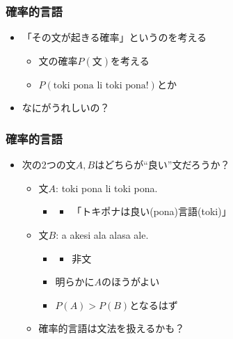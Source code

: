 \documentclass[14pt]{beamer}
\begin{document}
\begin{frame}
	\frametitle{確率的言語}

	\begin{itemize}
		\item 「その文が起きる確率」というのを考える
			\begin{itemize}
				\item 文の確率$P(\text{文})$を考える
				\item $P(\text{toki pona li toki pona!})$とか
			\end{itemize}
		\item なにがうれしいの？
	\end{itemize}
\end{frame}

\begin{frame}
	\frametitle{確率的言語}

	\begin{itemize}
		\item 次の2つの文$A, B$はどちらが``良い''文だろうか？
			\begin{itemize}
				\item 文$A$: toki pona li toki pona.
					\begin{itemize}
						\item[]
						\begin{itemize}
							\item 「トキポナは良い(pona)言語(toki)」
						\end{itemize}
					\end{itemize}
				\item 文$B$: a akesi ala alasa ale.
					\begin{itemize}
						\item[]
							\begin{itemize}
								\item 非文
							\end{itemize}
					\end{itemize}
					\begin{itemize}
						\item 明らかに$A$のほうがよい
						\item $P(A) > P(B)$となるはず
					\end{itemize}
				\item 確率的言語は\alert{文法を扱える}かも？
			\end{itemize}
	\end{itemize}
\end{frame}
\end{document}

